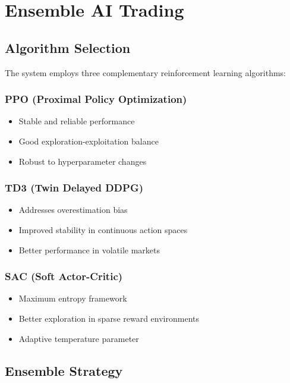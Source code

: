 \documentclass[11pt,a4paper]{article}
\begin{document}
\section{Ensemble AI Trading}

\subsection{Algorithm Selection}

The system employs three complementary reinforcement learning algorithms:

\subsubsection{PPO (Proximal Policy Optimization)}
\begin{itemize}
    \item Stable and reliable performance
    \item Good exploration-exploitation balance
    \item Robust to hyperparameter changes
\end{itemize}

\subsubsection{TD3 (Twin Delayed DDPG)}
\begin{itemize}
    \item Addresses overestimation bias
    \item Improved stability in continuous action spaces
    \item Better performance in volatile markets
\end{itemize}

\subsubsection{SAC (Soft Actor-Critic)}
\begin{itemize}
    \item Maximum entropy framework
    \item Better exploration in sparse reward environments
    \item Adaptive temperature parameter
\end{itemize}

\subsection{Ensemble Strategy}
\end{document}
